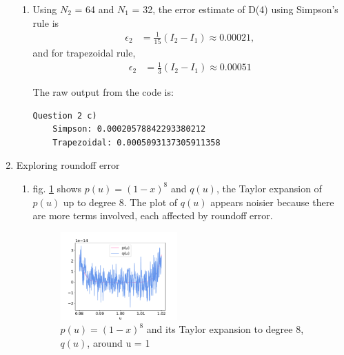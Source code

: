\documentclass{article}
\begin{document}
\begin{enumerate}
\begin{enumerate}

    \item Using $N_2$ = 64 and $N_1$ = 32, the error estimate of D(4) using Simpson's rule is 
        \begin{align*}
            \epsilon_2& = \frac{1}{15}(I_2-I_1) \approx 0.00021,
        \end{align*}
    and for trapezoidal rule, 
        \begin{align*}
            \epsilon_2 &= \frac{1}{3}(I_2-I_1) \approx 0.00051
        \end{align*}

    The raw output from the code is:

    \begin{verbatim}
Question 2 c)
    Simpson: 0.00020578842293380212
    Trapezoidal: 0.0005093137305911358
    \end{verbatim}

\end{enumerate}

\item Exploring roundoff error
\begin{enumerate}
    \item fig. \ref{fig:3a} shows $p(u)=(1-x)^8$ and $q(u)$, the Taylor expansion of $p(u)$ up to degree 8. The plot of $q(u)$ appears noisier because there are more terms involved, each affected by roundoff error.
    \begin{figure}[h]
        \centering
        \includegraphics[width=0.45\textwidth]{3a.pdf}
        \caption{$p(u) = (1-x)^8$ and its Taylor expansion to degree 8, $q(u)$, around u = 1}
        \label{fig:3a}
    \end{figure} 


\end{enumerate}
\end{enumerate}
\end{document}
